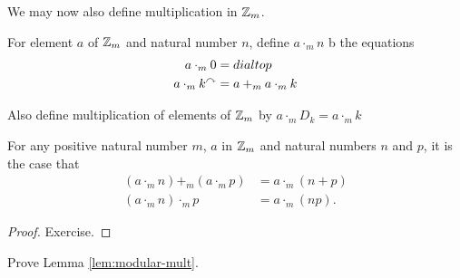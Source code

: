 We may now also define multiplication in ${\mathbb Z}_m$.

\begin{defn}
	For element $a$ of ${\mathbb Z}_m$ and natural number $n$, define $a\cdot_m n$ b the equations
	\begin{align*}
		a\cdot_m  0 &= dialtop\\
		a\cdot_m k^\curvearrowright &= a +_m a\cdot_m k
	\end{align*}
	
	Also define multiplication of elements of ${\mathbb Z}_{m}$ by $a\cdot_m D_k = a\cdot_m k$
\end{defn}


\begin{lem}\label{lem:modular-mult}
	For any positive natural number $m$, $a$ in ${\mathbb Z}_m$ and natural numbers $n$ and $p$, it is the case that 
	\begin{align*} 
		(a \cdot_m n)+_m (a\cdot_m p) &= a\cdot_m (n+p)\\
		(a\cdot_m n)\cdot_m p &= a\cdot_m (np).
	\end{align*}

\begin{proof}
	Exercise.
\end{proof}
\end{lem}

\begin{exer}
	\begin{exercise}
		\item Prove Lemma \ref{lem:modular-mult}.
	\end{exercise}
\end{exer}





